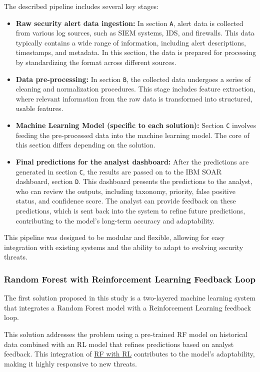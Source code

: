 The described pipeline includes several key stages:
\begin{itemize}
    \item \textbf{Raw security alert data ingestion:} In section \texttt{A}, alert data is collected from various log sources, such as SIEM systems, IDS, and firewalls. This data typically contains a wide range of information, including alert descriptions, timestamps, and metadata. In this section, the data is prepared for processing by standardizing the format across different sources.
    \item \textbf{Data pre-processing:} In section \texttt{B}, the collected data undergoes a series of cleaning and normalization procedures. This stage includes feature extraction, where relevant information from the raw data is transformed into structured, usable features.
    \item \textbf{Machine Learning Model (specific to each solution):} Section \texttt{C} involves feeding the pre-processed data into the machine learning model. The core of this section differs depending on the solution.
    \item \textbf{Final predictions for the analyst dashboard:} After the predictions are generated in section \texttt{C}, the results are passed on to the IBM SOAR dashboard, section \texttt{D}. This dashboard presents the predictions to the analyst, who can review the outputs, including taxonomy, priority, false positive status, and confidence score. The analyst can provide feedback on these predictions, which is sent back into the system to refine future predictions, contributing to the model's long-term accuracy and adaptability.
\end{itemize}

This pipeline was designed to be modular and flexible, allowing for easy integration with existing systems and the ability to adapt to evolving security threats.

\subsubsection{Random Forest with Reinforcement Learning Feedback Loop}

The first solution proposed in this study is a two-layered machine learning system that integrates a Random Forest model with a Reinforcement Learning feedback loop. 

This solution addresses the problem using a pre-trained RF model on historical data combined with an RL model that refines predictions based on analyst feedback.
This integration of \underline{RF with RL} contributes to the model's adaptability, making it highly responsive to new threats.

